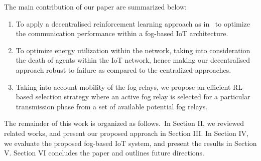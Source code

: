 \documentclass[journal]{IEEEtran}
\begin{document}
The main contribution of our paper are summarized below: 
\begin{enumerate}
  \item To apply a decentralised reinforcement learning approach as in~\cite{Gueriau2018} to optimize the communication performance within a fog-based IoT architecture.
  \item To optimize energy utilization within the network, taking into consideration the death of agents within the IoT network, hence making our decentralised approach robust to failure as compared to the centralized approaches.
  \item Taking into account mobility of the fog relays, we propose an efficient RL-based selection strategy where an active fog relay is selected for a particular transmission phase from a set of available potential fog relays.
\end{enumerate}

The remainder of this work is organized as follows.~In Section II, we reviewed related works, and present our proposed approach in Section III. In Section IV, we evaluate the proposed fog-based IoT system, and present the results in Section V. Section VI concludes the paper and outlines future directions.
\end{document}

